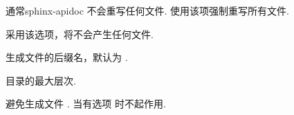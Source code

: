 \documentclass[letterpaper,10pt,english]{sphinxmanual}
\begin{document}

\begin{fulllineitems}
\label{invocation:cmdoption-sphinx-apidoc-f}
通常sphinx-apidoc 不会重写任何文件.  使用该项强制重写所有文件.

\end{fulllineitems}


\begin{fulllineitems}
\label{invocation:cmdoption-sphinx-apidoc-n}
采用该选项，将不会产生任何文件.

\end{fulllineitems}


\begin{fulllineitems}
\label{invocation:cmdoption-sphinx-apidoc-s}
生成文件的后缀名，默认为 .

\end{fulllineitems}


\begin{fulllineitems}
\label{invocation:cmdoption-sphinx-apidoc-d}
目录的最大层次.

\end{fulllineitems}


\begin{fulllineitems}
\label{invocation:cmdoption-sphinx-apidoc-T}
避免生成文件 .
当有选项 {\hyperref[invocation:cmdoption\string-sphinx\string-apidoc\string-\string-full]{}} 时不起作用.

\end{fulllineitems}

\end{document}
